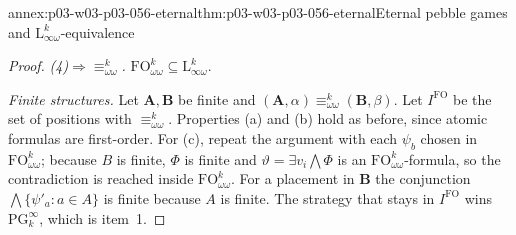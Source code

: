 \begin{annexitem}{annex:p03-w03-p03-056-eternal}{thm:p03-w03-p03-056-eternal}{Eternal pebble games and \(\mathrm{L}^k_{\infty\omega}\)-equivalence}
\begin{proof}
\emph{(4)\(\Rightarrow\)\(\equiv^k_{\omega\omega}\).}
\(\mathrm{FO}^k_{\omega\omega}\subseteq\mathrm{L}^k_{\infty\omega}\).

\emph{Finite structures.} Let \(\mathbf A,\mathbf B\) be finite and
\((\mathbf A,\alpha)\equiv^k_{\omega\omega}(\mathbf B,\beta)\). Let
\(I^{\mathrm{FO}}\) be the set of positions with
\(\equiv^k_{\omega\omega}\). Properties (a) and (b) hold as before, since
atomic formulas are first-order. For (c), repeat the argument with each
\(\psi_b\) chosen in \(\mathrm{FO}^k_{\omega\omega}\); because \(B\) is
finite, \(\Phi\) is finite and \(\vartheta=\exists v_i\bigwedge\Phi\) is an
\(\mathrm{FO}^k_{\omega\omega}\)-formula, so the contradiction is reached
inside \(\mathrm{FO}^k_{\omega\omega}\). For a placement in \(\mathbf B\)
the conjunction \(\bigwedge\{\psi'_a:a\in A\}\) is finite because \(A\) is
finite. The strategy that stays in \(I^{\mathrm{FO}}\) wins
\(\mathrm{PG}^\infty_k\), which is item~1.
\end{proof}
\end{annexitem}

